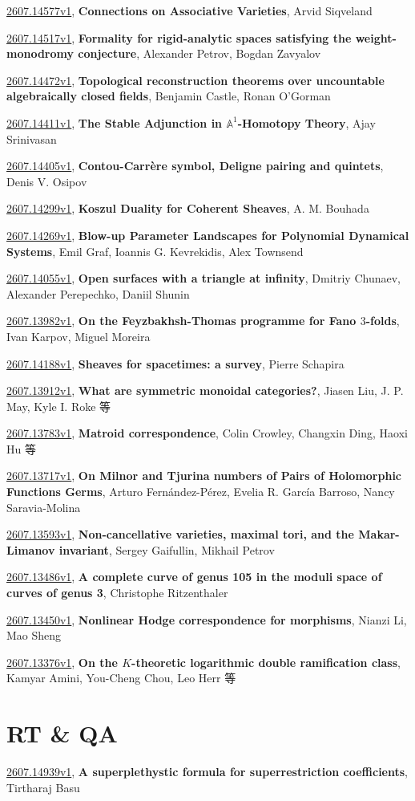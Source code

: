 \documentclass[9pt, a4paper]{article}
\theoremstyle{plain}
\theoremstyle{definition}
\theoremstyle{remark}
\newcommand{\arxiv}[3]{\href{https://arxiv.org/abs/#1}{#1}, \textbf{\textcolor{arxivblue}{#2}}, #3}
\begin{document}
\arxiv{2607.14577v1}{Connections on Associative Varieties}{Arvid Siqveland}

\arxiv{2607.14517v1}{Formality for rigid-analytic spaces satisfying the weight-monodromy conjecture}{Alexander Petrov, Bogdan Zavyalov}

\arxiv{2607.14472v1}{Topological reconstruction theorems over uncountable algebraically closed fields}{Benjamin Castle, Ronan O'Gorman}

\arxiv{2607.14411v1}{The Stable Adjunction in $\mathbb{A}^1$-Homotopy Theory}{Ajay Srinivasan}

\arxiv{2607.14405v1}{Contou-Carrère symbol, Deligne pairing and quintets}{Denis V. Osipov}

\arxiv{2607.14299v1}{Koszul Duality for Coherent Sheaves}{A. M. Bouhada}

\arxiv{2607.14269v1}{Blow-up Parameter Landscapes for Polynomial Dynamical Systems}{Emil Graf, Ioannis G. Kevrekidis, Alex Townsend}

\arxiv{2607.14055v1}{Open surfaces with a triangle at infinity}{Dmitriy Chunaev, Alexander Perepechko, Daniil Shunin}

\arxiv{2607.13982v1}{On the Feyzbakhsh-Thomas programme for Fano $3$-folds}{Ivan Karpov, Miguel Moreira}

\arxiv{2607.14188v1}{Sheaves for spacetimes: a survey}{Pierre Schapira}

\arxiv{2607.13912v1}{What are symmetric monoidal categories?}{Jiasen Liu, J. P. May, Kyle I. Roke 等}

\arxiv{2607.13783v1}{Matroid correspondence}{Colin Crowley, Changxin Ding, Haoxi Hu 等}

\arxiv{2607.13717v1}{On Milnor and Tjurina numbers of Pairs of Holomorphic Functions Germs}{Arturo Fernández-Pérez, Evelia R. García Barroso, Nancy Saravia-Molina}

\arxiv{2607.13593v1}{Non-cancellative varieties, maximal tori, and the Makar-Limanov invariant}{Sergey Gaifullin, Mikhail Petrov}

\arxiv{2607.13486v1}{A complete curve of genus 105 in the moduli space of curves of genus 3}{Christophe Ritzenthaler}

\arxiv{2607.13450v1}{Nonlinear Hodge correspondence for morphisms}{Nianzi Li, Mao Sheng}

\arxiv{2607.13376v1}{On the $K$-theoretic logarithmic double ramification class}{Kamyar Amini, You-Cheng Chou, Leo Herr 等}


\section{RT \& QA}
\arxiv{2607.14939v1}{A superplethystic formula for superrestriction coefficients}{Tirtharaj Basu}
\end{document}
